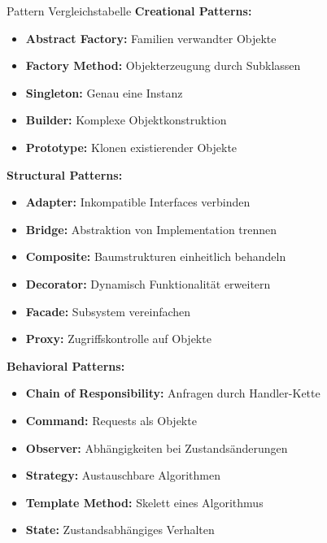 \begin{example2}{Pattern Vergleichstabelle}
\textbf{Creational Patterns:}
\begin{itemize}
   \item \textbf{Abstract Factory:} Familien verwandter Objekte
   \item \textbf{Factory Method:} Objekterzeugung durch Subklassen
   \item \textbf{Singleton:} Genau eine Instanz
   \item \textbf{Builder:} Komplexe Objektkonstruktion
   \item \textbf{Prototype:} Klonen existierender Objekte
\end{itemize}

\textbf{Structural Patterns:}
\begin{itemize}
   \item \textbf{Adapter:} Inkompatible Interfaces verbinden
   \item \textbf{Bridge:} Abstraktion von Implementation trennen
   \item \textbf{Composite:} Baumstrukturen einheitlich behandeln
   \item \textbf{Decorator:} Dynamisch Funktionalität erweitern
   \item \textbf{Facade:} Subsystem vereinfachen
   \item \textbf{Proxy:} Zugriffskontrolle auf Objekte
\end{itemize}

\textbf{Behavioral Patterns:}
\begin{itemize}
   \item \textbf{Chain of Responsibility:} Anfragen durch Handler-Kette
   \item \textbf{Command:} Requests als Objekte
   \item \textbf{Observer:} Abhängigkeiten bei Zustandsänderungen
   \item \textbf{Strategy:} Austauschbare Algorithmen
   \item \textbf{Template Method:} Skelett eines Algorithmus
   \item \textbf{State:} Zustandsabhängiges Verhalten
\end{itemize}
\end{example2}

